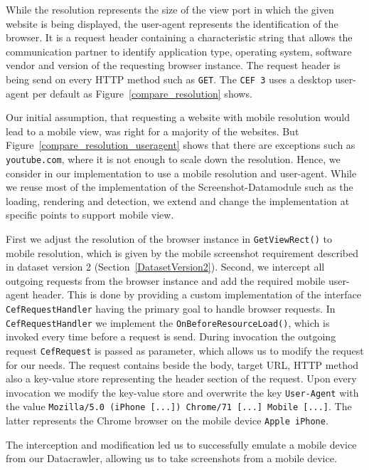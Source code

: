 While the resolution represents the size of the view port in which the given website is being displayed, the user-agent represents the identification of the browser. It is a request header containing a characteristic string that allows the communication partner to identify application type, operating system, software vendor and version of the requesting browser instance. The request header is being send on every HTTP method such as \texttt{GET}. The \texttt{CEF 3} uses a desktop user-agent per default as Figure~\ref{compare_resolution} shows.

Our initial assumption, that requesting a website with mobile resolution would lead to a mobile view, was right for a majority of the websites. But Figure~\ref{compare_resolution_useragent} shows that there are exceptions such as \texttt{youtube.com}, where it is not enough to scale down the resolution. Hence, we consider in our implementation to use a mobile resolution and user-agent. While we reuse most of the implementation of the Screenshot-Datamodule such as the loading, rendering and detection, we extend and change the implementation at specific points to support mobile view.

First we adjust the resolution of the browser instance in \texttt{GetViewRect()} to mobile resolution, which is given by the mobile screenshot requirement described in dataset version 2 (Section~\ref{DatasetVersion2}). Second, we intercept all outgoing requests from the browser instance and add the required mobile user-agent header. This is done by providing a custom implementation of the interface \texttt{CefRequestHandler} having the primary goal to handle browser requests. In \texttt{CefRequestHandler} we implement the \texttt{OnBeforeResourceLoad()}, which is invoked every time before a request is send. During invocation the outgoing request \texttt{CefRequest} is passed as parameter, which allows us to modify the request for our needs. The request contains beside the body, target URL, HTTP method also a key-value store representing the header section of the request. Upon every invocation we modify the key-value store and overwrite the key \texttt{User-Agent} with the value \texttt{Mozilla/5.0 (iPhone [...]) Chrome/71 [...] Mobile [...]}. The latter represents the Chrome browser on the mobile device \texttt{Apple iPhone}. 

The interception and modification led us to successfully emulate a mobile device from our Datacrawler, allowing us to take screenshots from a mobile device.

